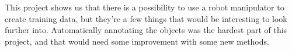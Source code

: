 This project shows us that there is a possibility to use a robot manipulator to create training data, but they're a few things that would be interesting to look further into. Automatically annotating the objects was the hardest part of this project, and that would need some improvement with some new methods.  





